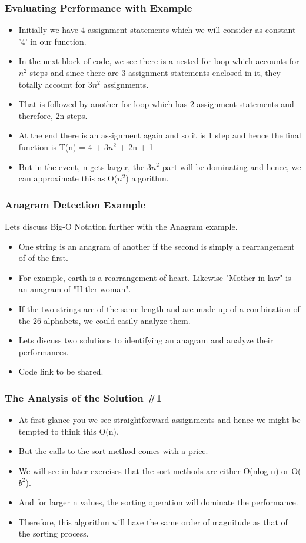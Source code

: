 \documentclass{beamer}
\begin{document}
\begin{frame}[fragile]
\frametitle{Evaluating Performance with Example}
\begin{itemize}
\item Initially we have 4 assignment statements which we will consider as constant '4' in our function.
\item In the next block of code, we see there is a nested for loop which accounts for $n^2$ steps and since there are 3 assignment statements enclosed in it, they totally account for 3$n^2$ assignments.
\item That is followed by another for loop which has 2 assignment statements and therefore, 2n steps.
\item At the end there is an assignment again and so it is 1 step and hence the final function is  
T(n) = 4 + 3$n^2$ + 2n + 1
\item But in the event, n gets larger, the 3$n^2$ part will be dominating and hence, we can approximate this as O($n^2$) algorithm.
\end{itemize}
\end{frame}

\begin{frame}[fragile]
\frametitle{Anagram Detection Example}
Lets discuss Big-O Notation further with the Anagram example.
\begin{itemize}
\item One string is an anagram of another if the second is simply a rearrangement of of the first.
\item For example, earth is a rearrangement of heart. Likewise "Mother in law" is an anagram of "Hitler woman".
\item If the two strings are of  the same length and are made up of a combination of the 26 alphabets, we could easily analyze them.
\item Lets discuss two solutions to identifying an anagram and analyze their performances.
\item Code link to be shared.
\end{itemize}
\end{frame}


\begin{frame}
\frametitle{The Analysis of the Solution 
\#1}
\begin{itemize}
\item At first glance you we see straightforward assignments and hence we might be tempted to think this O(n).
\item But the calls to the sort method comes with a price.
\item We will see in later exercises that the sort methods are either O(nlog n) or O($b^2$).
\item And for larger n values, the sorting operation will dominate the performance.
\item Therefore, this algorithm will have the same order of magnitude as that of the sorting process.
\end{itemize}
\end{frame}
\end{document}
